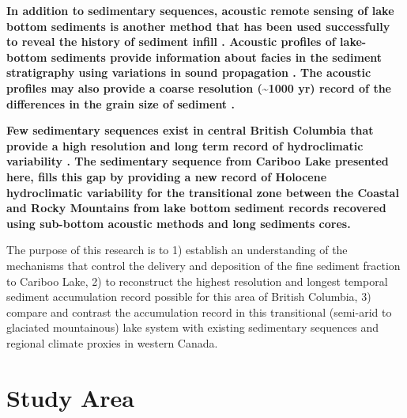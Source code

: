 \documentclass[Royal,times,doublespace,sageh]{sagej}
\begin{document}
\textbf{In addition to sedimentary sequences, acoustic remote sensing of
lake bottom sediments is another method that has been used successfully
to reveal the history of sediment infill
\citep{Desloges1994d, Hodder2006b, Gilbert2012, VanRensbergen1999}.
Acoustic profiles of lake-bottom sediments provide information about
facies in the sediment stratigraphy using variations in sound
propagation \citep{LeBlanc1992}. The acoustic profiles may also provide
a coarse resolution (\textasciitilde1000 yr) record of the differences
in the grain size of sediment \citep[e.g.~strong acoustic reflectors
correlated to an energetic sedimentary environment in][]{Hodder2006b}.}

\textbf{Few sedimentary sequences exist in central British Columbia that
provide a high resolution and long term record of hydroclimatic
variability
\citep{Gilbert2012, Hodder2006b, Menounos2009b, Maurer2012b}. The
sedimentary sequence from Cariboo Lake presented here, fills this gap by
providing a new record of Holocene hydroclimatic variability for the
transitional zone between the Coastal and Rocky Mountains from lake
bottom sediment records recovered using sub-bottom acoustic methods and
long sediments cores.}

The purpose of this research is to 1) establish an understanding of the
mechanisms that control the delivery and deposition of the fine sediment
fraction to Cariboo Lake, 2) to reconstruct the highest resolution and
longest temporal sediment accumulation record possible for this area of
British Columbia, 3) compare and contrast the accumulation record in
this transitional (semi-arid to glaciated mountainous) lake system with
existing sedimentary sequences and regional climate proxies in western
Canada.

\hypertarget{study-area}{%
\section{Study Area}\label{study-area}}
\end{document}
